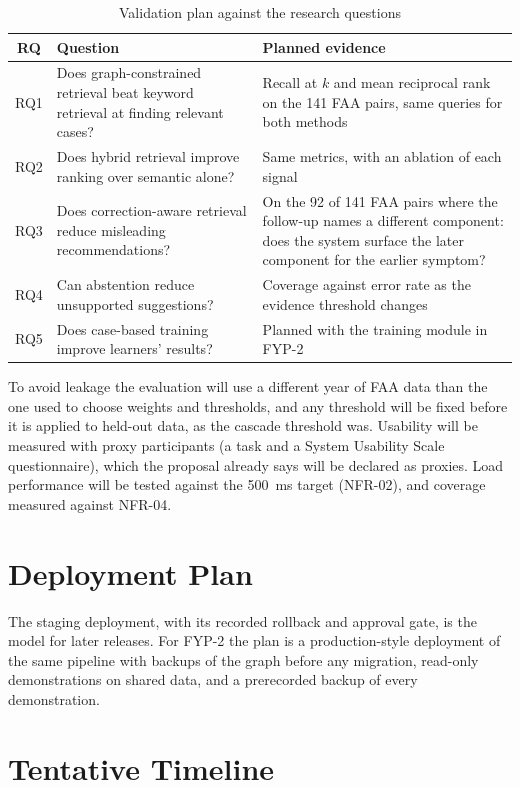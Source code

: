 \begin{table}[!htbp]
\centering
\caption{Validation plan against the research questions}
\label{tab:validation-plan}
\small
\begin{tabularx}{\textwidth}{@{}c L L@{}}
\toprule
RQ & Question & Planned evidence \\
\midrule
RQ1 & Does graph-constrained retrieval beat keyword retrieval at finding relevant cases? & Recall at $k$ and mean reciprocal rank on the 141 FAA pairs, same queries for both methods \\
RQ2 & Does hybrid retrieval improve ranking over semantic alone? & Same metrics, with an ablation of each signal \\
RQ3 & Does correction-aware retrieval reduce misleading recommendations? & On the 92 of 141 FAA pairs where the follow-up names a different component: does the system surface the later component for the earlier symptom? \\
RQ4 & Can abstention reduce unsupported suggestions? & Coverage against error rate as the evidence threshold changes \\
RQ5 & Does case-based training improve learners' results? & Planned with the training module in FYP-2 \\
\bottomrule
\end{tabularx}
\end{table}

To avoid leakage the evaluation will use a different year of FAA data than the one used to choose weights and thresholds, and any threshold will be fixed before it is applied to held-out data, as the cascade threshold was. Usability will be measured with proxy participants (a task and a System Usability Scale questionnaire), which the proposal already says will be declared as proxies. Load performance will be tested against the 500~ms target (NFR-02), and coverage measured against NFR-04.

\section{Deployment Plan}

The staging deployment, with its recorded rollback and approval gate, is the model for later releases. For FYP-2 the plan is a production-style deployment of the same pipeline with backups of the graph before any migration, read-only demonstrations on shared data, and a prerecorded backup of every demonstration.

\section{Tentative Timeline}

